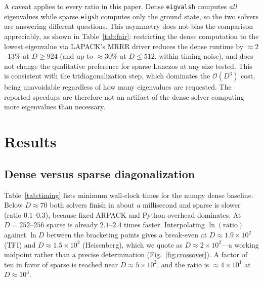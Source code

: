 \documentclass[pdflatex,sn-mathphys-num]{sn-jnl}
\begin{document}
A caveat applies to every ratio in this paper. Dense
\texttt{eigvalsh} computes \emph{all} eigenvalues while sparse
\texttt{eigsh} computes only the ground state, so the two solvers are
answering different questions. This asymmetry does not bias the
comparison appreciably, as shown in Table~\ref{tab:fair}:
restricting the dense computation to the lowest eigenvalue via
LAPACK's MRRR driver reduces the dense runtime by $\approx 2$--$13\%$
at $D \geq 924$ (and up to $\approx 30\%$ at $D \leq 512$, within
timing noise), and does not change the qualitative preference for
sparse Lanczos at any size tested. This is consistent with the
tridiagonalization step, which dominates the $\mathcal{O}(D^{3})$
cost, being unavoidable regardless of how many eigenvalues are
requested. The reported speedups are therefore not an artifact of
the dense solver computing more eigenvalues than necessary.

\section{Results}
\label{sec:results}

\subsection{Dense versus sparse diagonalization}
\label{sec:timing}

Table~\ref{tab:timing} lists minimum wall-clock times for the numpy
dense baseline. Below $D \approx 70$ both solvers finish in about a
millisecond and sparse is slower (ratio $0.1$--$0.3$), because fixed
ARPACK and Python overhead dominates. At $D = 252$--$256$ sparse is
already $2.1$--$2.4$ times faster. Interpolating $\ln(\text{ratio})$
against $\ln D$ between the bracketing points gives a break-even at
$D \approx 1.9\times10^{2}$ (TFI) and $D \approx 1.5\times10^{2}$
(Heisenberg), which we quote as $D \approx 2\times10^{2}$---a
working midpoint rather than a precise determination
(Fig.~\ref{fig:crossover}). A factor of ten in favor of sparse is
reached near $D \approx 5\times10^{2}$, and the ratio is
$\approx 4\times10^{1}$ at $D \approx 10^{3}$.
\end{document}
